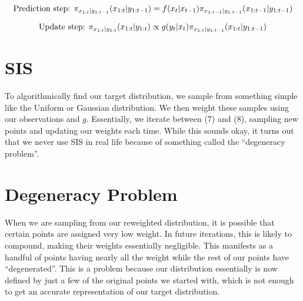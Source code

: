 \documentclass{article}
\begin{document}
\begin{equation}
\textnormal{Prediction step:  }
\pi_{x_{1:t}|y_{1:t-1}}(x_{1:t}|y_{1:t-1})= f(x_t|x_{t-1}) \pi_{x_{1:t-1}|y_{1:t-1}}(x_{1:t-1}|y_{1:t-1})
\end{equation}

\begin{equation}
\textnormal{Update step:  }
\pi_{x_{1:t}|y_{1:t}}(x_{1:t}|y_{1:t})\propto g(y_t|x_t)\pi_{x_{1:t}|y_{1:t-1}}(x_{1:t}|y_{1:t-1})
\end{equation}

\section{SIS}

To algorithmically find our target distribution, we sample from something simple like the Uniform or Gaussian distribution. We then weight these samples using our observations and $g$. Essentially, we iterate between (7) and (8), sampling new points and updating our weights each time. While this sounds okay, it turns out that we never use SIS in real life because of something called the ``degeneracy problem''.

\section{Degeneracy Problem}
When we are sampling from our reweighted distribution, it is possible that certain points are assigned very low weight. In future iterations, this is likely to compound, making their weights essentially negligible. This manifests as a handful of points having nearly all the weight while the rest of our points have ``degenerated''. This is a problem because our distribution essentially is now defined by just a few of the original points we started with, which is not enough to get an accurate representation of our target distribution.


\end{document}
